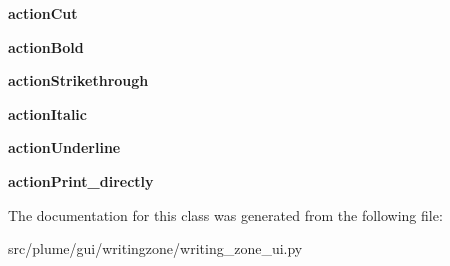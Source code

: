 \begin{DoxyCompactItemize}
\item 
{\bfseries action\+Cut}\hypertarget{classplume-creator_1_1src_1_1plume_1_1gui_1_1writingzone_1_1writing__zone__ui_1_1_ui___writing_zone_a7d455504a02b89fc66b358147b04065a}{}\label{classplume-creator_1_1src_1_1plume_1_1gui_1_1writingzone_1_1writing__zone__ui_1_1_ui___writing_zone_a7d455504a02b89fc66b358147b04065a}

\item 
{\bfseries action\+Bold}\hypertarget{classplume-creator_1_1src_1_1plume_1_1gui_1_1writingzone_1_1writing__zone__ui_1_1_ui___writing_zone_a8a1dd76d2d69921b07db9708d1362e13}{}\label{classplume-creator_1_1src_1_1plume_1_1gui_1_1writingzone_1_1writing__zone__ui_1_1_ui___writing_zone_a8a1dd76d2d69921b07db9708d1362e13}

\item 
{\bfseries action\+Strikethrough}\hypertarget{classplume-creator_1_1src_1_1plume_1_1gui_1_1writingzone_1_1writing__zone__ui_1_1_ui___writing_zone_aa501be0fecfbcb867f4fab6d8ba08a71}{}\label{classplume-creator_1_1src_1_1plume_1_1gui_1_1writingzone_1_1writing__zone__ui_1_1_ui___writing_zone_aa501be0fecfbcb867f4fab6d8ba08a71}

\item 
{\bfseries action\+Italic}\hypertarget{classplume-creator_1_1src_1_1plume_1_1gui_1_1writingzone_1_1writing__zone__ui_1_1_ui___writing_zone_a720ff79496e88fbb45cddc57053fe287}{}\label{classplume-creator_1_1src_1_1plume_1_1gui_1_1writingzone_1_1writing__zone__ui_1_1_ui___writing_zone_a720ff79496e88fbb45cddc57053fe287}

\item 
{\bfseries action\+Underline}\hypertarget{classplume-creator_1_1src_1_1plume_1_1gui_1_1writingzone_1_1writing__zone__ui_1_1_ui___writing_zone_aff1035fc8df88dcd5c085155a13cff49}{}\label{classplume-creator_1_1src_1_1plume_1_1gui_1_1writingzone_1_1writing__zone__ui_1_1_ui___writing_zone_aff1035fc8df88dcd5c085155a13cff49}

\item 
{\bfseries action\+Print\+\_\+directly}\hypertarget{classplume-creator_1_1src_1_1plume_1_1gui_1_1writingzone_1_1writing__zone__ui_1_1_ui___writing_zone_afe19d80e79e3220d4e24452e01a5f314}{}\label{classplume-creator_1_1src_1_1plume_1_1gui_1_1writingzone_1_1writing__zone__ui_1_1_ui___writing_zone_afe19d80e79e3220d4e24452e01a5f314}

\end{DoxyCompactItemize}


The documentation for this class was generated from the following file\+:\begin{DoxyCompactItemize}
\item 
src/plume/gui/writingzone/writing\+\_\+zone\+\_\+ui.\+py\end{DoxyCompactItemize}
